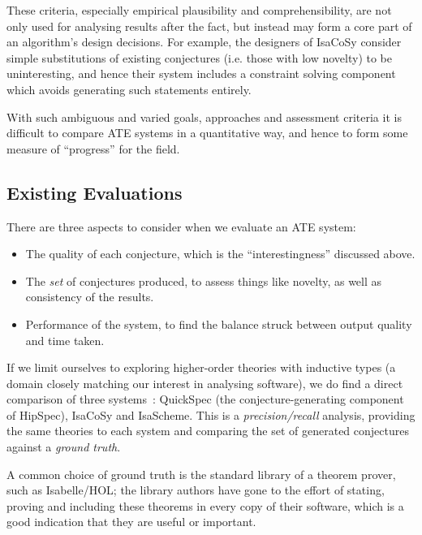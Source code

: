 These criteria, especially empirical plausibility and comprehensibility, are not
only used for analysing results after the fact, but instead may form a core part
of an algorithm's design decisions. For example, the designers of IsaCoSy
consider simple substitutions of existing conjectures (i.e. those with low
novelty) to be uninteresting, and hence their system includes a constraint
solving component which avoids generating such statements entirely.

With such ambiguous and varied goals, approaches and assessment criteria it is
difficult to compare ATE systems in a quantitative way, and hence to form some
measure of ``progress'' for the field.

\subsection{Existing Evaluations}
\label{sec:existing}

There are three aspects to consider when we evaluate an ATE system:

\begin{itemize}
\item The quality of each conjecture, which is the ``interestingness'' discussed
  above.
\item The \emph{set} of conjectures produced, to assess things like novelty, as
  well as consistency of the results.
\item Performance of the system, to find the balance struck between output
  quality and time taken.
\end{itemize}


If we limit ourselves to exploring higher-order theories with inductive types
(a domain closely matching our interest in analysing software), we do find a
direct comparison of three systems~\cite{claessen2013automating}: QuickSpec (the
conjecture-generating component of HipSpec), IsaCoSy and IsaScheme. This is a
\emph{precision/recall} analysis, providing the same theories to each system and
comparing the set of generated conjectures against a \emph{ground truth}.


A common choice of ground truth is the standard library of a theorem prover,
such as Isabelle/HOL; the library authors have gone to the effort of stating,
proving and including these theorems in every copy of their software, which is a
good indication that they are useful or important.

